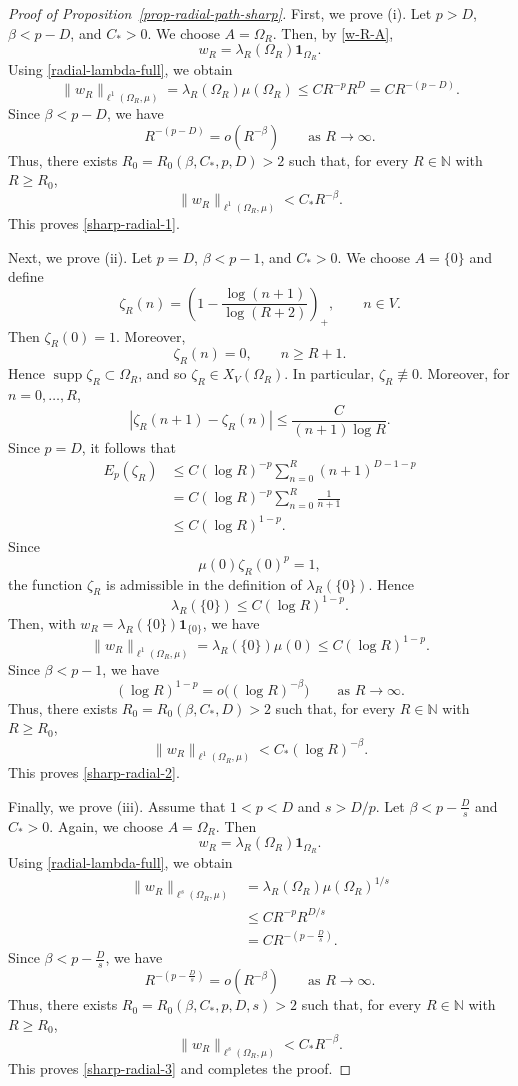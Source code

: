 \documentclass[twoside,12pt,letter]{article}
\theoremstyle{plain}
\theoremstyle{definition}
\theoremstyle{remark}
\numberwithin{equation}{section}
\begin{document}
\begin{proof}[Proof of Proposition~\ref{prop-radial-path-sharp}]
First, we prove {\rm(i)}. Let \(p>D\), \(\beta<p-D\), and \(C_*>0\). We choose
\(A=\Omega_R\). Then, by \eqref{w-R-A},
\[
w_R=\lambda_R(\Omega_R)\mathbf{1}_{\Omega_R}.
\]
Using \eqref{radial-lambda-full}, we obtain
\[
\|w_R\|_{\ell^1(\Omega_R,\mu)}
=
\lambda_R(\Omega_R)\mu(\Omega_R)
\le
C R^{-p}R^D
=
C R^{-(p-D)}.
\]
Since \(\beta<p-D\), we have
\[
R^{-(p-D)}=o(R^{-\beta})
\qquad \text{as } R\to\infty.
\]
Thus, there exists \(R_0=R_0(\beta,C_*,p,D)>2\) such that, for every
\(R\in\mathbb{N}\) with \(R\ge R_0\),
\[
\|w_R\|_{\ell^1(\Omega_R,\mu)}
<
C_*R^{-\beta}.
\]
This proves \eqref{sharp-radial-1}.

Next, we prove {\rm(ii)}. Let \(p=D\), \(\beta<p-1\), and \(C_*>0\). We
choose \(A=\{0\}\) and define
\[
\zeta_R(n)
=
\left(1-\frac{\log(n+1)}{\log(R+2)}\right)_+,
\qquad n\in V.
\]
Then \(\zeta_R(0)=1\). Moreover,
\[
\zeta_R(n)=0,
\qquad n\ge R+1.
\]
Hence \(\operatorname{supp}\zeta_R\subset\Omega_R\), and so
\(\zeta_R\in X_V(\Omega_R)\). In particular, \(\zeta_R\not\equiv 0\).
Moreover, for \(n=0,\ldots,R\),
\[
|\zeta_R(n+1)-\zeta_R(n)|
\le
\frac{C}{(n+1)\log R}.
\]
Since \(p=D\), it follows that
\[
\begin{aligned}
E_p(\zeta_R)
&\le
C(\log R)^{-p}
\sum_{n=0}^{R}(n+1)^{D-1-p}  \\
&=
C(\log R)^{-p}
\sum_{n=0}^{R}\frac{1}{n+1} \\
&\le
C(\log R)^{1-p}.
\end{aligned}
\]
Since
\[
\mu(0)\zeta_R(0)^p=1,
\]
the function \(\zeta_R\) is admissible in the definition of
\(\lambda_R(\{0\})\). Hence
\[
\lambda_R(\{0\})\le C(\log R)^{1-p}.
\]
Then, with \(w_R=\lambda_R(\{0\})\mathbf{1}_{\{0\}}\), we have
\[
\|w_R\|_{\ell^1(\Omega_R,\mu)}
=
\lambda_R(\{0\})\mu(0)
\le
C(\log R)^{1-p}.
\]
Since \(\beta<p-1\), we have
\[
(\log R)^{1-p}=o\bigl((\log R)^{-\beta}\bigr)
\qquad \text{as } R\to\infty.
\]
Thus, there exists \(R_0=R_0(\beta,C_*,D)>2\) such that, for every
\(R\in\mathbb{N}\) with \(R\ge R_0\),
\[
\|w_R\|_{\ell^1(\Omega_R,\mu)}
<
C_*(\log R)^{-\beta}.
\]
This proves \eqref{sharp-radial-2}.

Finally, we prove {\rm(iii)}. Assume that \(1<p<D\) and \(s>D/p\). Let
\(\beta<p-\frac{D}{s}\) and \(C_*>0\). Again, we choose \(A=\Omega_R\). Then
\[
w_R=\lambda_R(\Omega_R)\mathbf{1}_{\Omega_R}.
\]
Using \eqref{radial-lambda-full}, we obtain
\[
\begin{aligned}
\|w_R\|_{\ell^s(\Omega_R,\mu)}
&=
\lambda_R(\Omega_R)\mu(\Omega_R)^{1/s}  \\
&\le
C R^{-p}R^{D/s} \\
&=
C R^{-\left(p-\frac{D}{s}\right)}.
\end{aligned}
\]
Since \(\beta<p-\frac{D}{s}\), we have
\[
R^{-\left(p-\frac{D}{s}\right)}
=
o(R^{-\beta})
\qquad \text{as } R\to\infty.
\]
Thus, there exists \(R_0=R_0(\beta,C_*,p,D,s)>2\) such that, for every
\(R\in\mathbb{N}\) with \(R\ge R_0\),
\[
\|w_R\|_{\ell^s(\Omega_R,\mu)}
<
C_*R^{-\beta}.
\]
This proves \eqref{sharp-radial-3} and completes the proof.
\end{proof}
\end{document}

